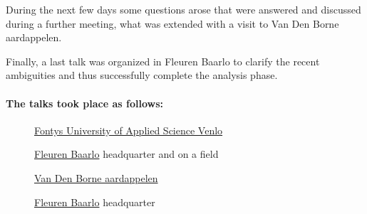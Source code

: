 During the next few days some questions arose that were answered and discussed during a further meeting, what was extended with a visit to Van Den Borne aardappelen.

Finally, a last talk was organized in Fleuren Baarlo to clarify the recent ambiguities and thus successfully complete the analysis phase.

\paragraph{The talks took place as follows:}
\begin{description}
	\item[] \href{http://fontys.nl}{Fontys University of Applied Science Venlo}
	\item[] \href{http://fleuren.net}{Fleuren Baarlo} headquarter and on a field
	\item[] \href{http://www.vandenborneaardappelen.com}{Van Den Borne aardappelen}
	\item[] \href{http://fleuren.net}{Fleuren Baarlo} headquarter
\end{description}
